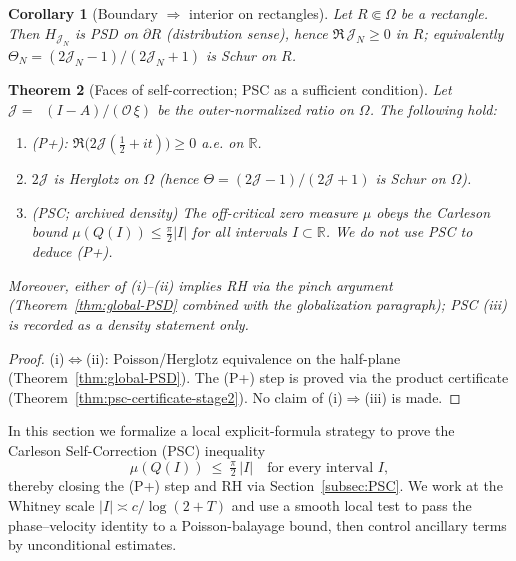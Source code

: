 \documentclass[11pt]{article}
\newtheorem{theorem}{Theorem}
\newtheorem{corollary}[theorem]{Corollary}
\theoremstyle{definition}
\theoremstyle{remark}
\newcommand{\R}{\mathbb{R}}
\DeclareMathOperator{\dettwo}{det_2}
\begin{document}
\begin{corollary}[Boundary $\Rightarrow$ interior on rectangles]\label{cor:bdry-to-int}
Let $R\Subset\Omega$ be a rectangle. Then $H_{\mathcal J_N}$ is PSD on $\partial R$ (distribution sense), hence $\Re \,\mathcal J_N\ge 0$ in $R$; equivalently $\Theta_N=(2\mathcal J_N-1)/(2\mathcal J_N+1)$ is Schur on $R$.
\end{corollary}
\begin{theorem}[Faces of self-correction; PSC as a sufficient condition]\label{thm:SC-equivalences}
Let $\mathcal J=\dettwo(I-A)/(\mathcal O\,\xi)$ be the outer-normalized ratio on $\Omega$. The following hold:
\begin{enumerate}
\item[\textup{(i)}] \textup{(P+)}: $\Re\bigl(2\mathcal J(\tfrac12+it)\bigr)\ge 0$ a.e. on $\R$.
\item[\textup{(ii)}] $2\mathcal J$ is Herglotz on $\Omega$ (hence $\Theta=(2\mathcal J-1)/(2\mathcal J+1)$ is Schur on $\Omega$).
\item[\textup{(iii)}] (PSC; archived density) The off-critical zero measure $\mu$ obeys the Carleson bound $\mu(Q(I))\le \tfrac{\pi}{2}|I|$ for all intervals $I\subset\R$. We do not use PSC to deduce (P+).
\end{enumerate}
Moreover, either of (i)–(ii) implies RH via the pinch argument (Theorem~\ref{thm:global-PSD} combined with the globalization paragraph); PSC (iii) is recorded as a density statement only.
\end{theorem}
\begin{proof}
(i)$\Leftrightarrow$(ii): Poisson/Herglotz equivalence on the half-plane (Theorem~\ref{thm:global-PSD}). The (P+) step is proved via the product certificate (Theorem~\ref{thm:psc-certificate-stage2}). No claim of (i)$\Rightarrow$(iii) is made.
\end{proof}


\medskip
In this section we formalize a local explicit-formula strategy to prove the Carleson Self-Correction (PSC) inequality
\[ \mu(Q(I))\ \le\ \tfrac{\pi}{2}\,|I| \quad\text{for every interval } I, \]
thereby closing the (P+) step and RH via Section~\ref{subsec:PSC}. We work at the Whitney scale \(|I|\asymp c/\log(2+T)\) and use a smooth local test to pass the phase--velocity identity to a Poisson-balayage bound, then control ancillary terms by unconditional estimates.
\end{document}
